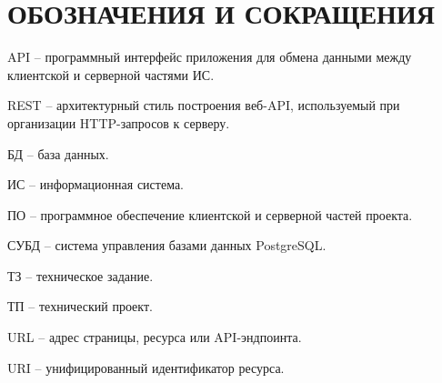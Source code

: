 \section*{ОБОЗНАЧЕНИЯ И СОКРАЩЕНИЯ}

API -- программный интерфейс приложения для обмена данными между клиентской и серверной частями ИС.

REST -- архитектурный стиль построения веб-API, используемый при организации HTTP-запросов к серверу.

БД -- база данных.

ИС -- информационная система.

ПО -- программное обеспечение клиентской и серверной частей проекта.

СУБД -- система управления базами данных PostgreSQL.

ТЗ -- техническое задание.

ТП -- технический проект.

URL -- адрес страницы, ресурса или API-эндпоинта.

URI -- унифицированный идентификатор ресурса.


